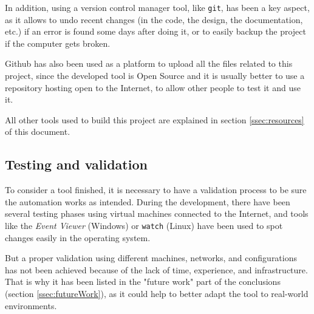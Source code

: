 \pagebreak
In addition, using a version control manager tool, like \texttt{git}, has been a key aspect, as it allows to undo recent changes (in the code, the design, the documentation, etc.) if an error is found some days after doing it, or to easily backup the project if the computer gets broken. 

Github\cite{ThisProjectGit} has also been used as a platform to upload all the files related to this project, since the developed tool is Open Source and it is usually better to use a repository hosting open to the Internet, to allow other people to test it and use it. 

All other tools used to build this project are explained in section \ref{ssec:resources} of this document.

\subsection{Testing and validation}
To consider a tool finished, it is necessary to have a validation process to be sure the automation works as intended. During the development, there have been several testing phases using virtual machines connected to the Internet, and tools like the \textit{Event Viewer} (Windows) or \texttt{watch} (Linux) have been used to spot changes easily in the operating system.

But a proper validation using different machines, networks, and configurations has not been achieved because of the lack of time, experience, and infrastructure. That is why it has been listed in the "future work" part of the conclusions (section \ref{ssec:futureWork}), as it could help to better adapt the tool to real-world environments.